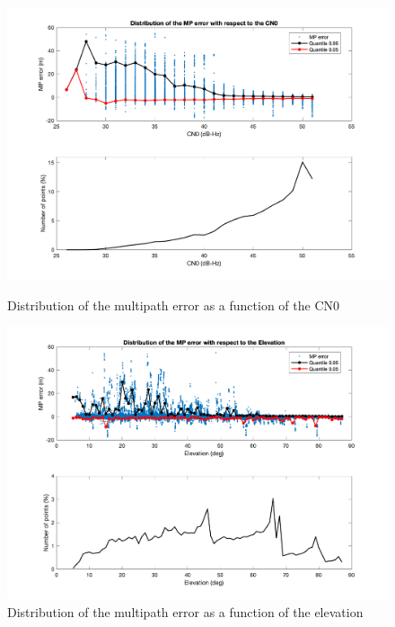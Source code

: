 \documentclass[a4paper, report, oneside, UKenglish]{memoir}
\begin{document}
\begin{figure}[hb]
  \centering
  \begin{minipage}[b]{0.49\textwidth}
    \includegraphics[width=\textwidth]{data-analysis/mpn_cn0.png}
    \caption{Distribution of the multipath error as a function of the CN0}
    \label{fig:mpn_cn0}
  \end{minipage}
  \hfill
  \begin{minipage}[b]{0.49\textwidth}
    \includegraphics[width=\textwidth]{data-analysis/mpn_elev.png}
    \caption{Distribution of the multipath error as a function of the elevation}
    \label{fig:mpn_elev}
  \end{minipage}
\end{figure}
\end{document}
